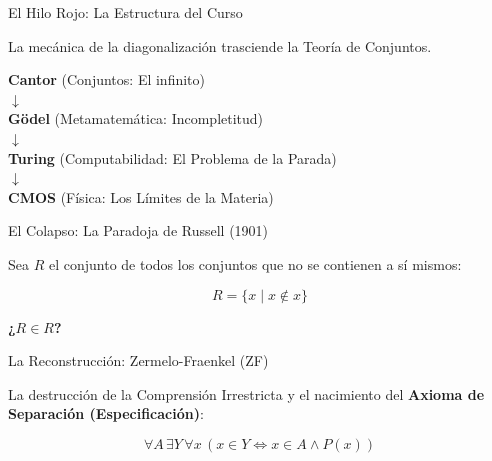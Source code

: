 \documentclass[10pt, aspectratio=169]{beamer}
\begin{document}
\begin{frame}{El Hilo Rojo: La Estructura del Curso}
    \begin{center}
        La mecánica de la diagonalización trasciende la Teoría de Conjuntos.
        
        \vspace{0.6cm}
        \large
        \textbf{Cantor} (Conjuntos: El infinito) \\
        $\downarrow$ \\
        \textbf{Gödel} (Metamatemática: Incompletitud) \\
        $\downarrow$ \\
        \textbf{Turing} (Computabilidad: El Problema de la Parada) \\
        $\downarrow$ \\
        \textbf{CMOS} (Física: Los Límites de la Materia)
    \end{center}
\end{frame}

\begin{frame}{El Colapso: La Paradoja de Russell (1901)}
    \begin{center}
        Sea $R$ el conjunto de todos los conjuntos que no se contienen a sí mismos:
        
        \Large
        \begin{equation*}
            R = \{x \mid x \notin x\}
        \end{equation*}
        
        \vspace{0.8cm}
        \alert{\textbf{¿$R \in R$?}}
    \end{center}
\end{frame}

\begin{frame}{La Reconstrucción: Zermelo-Fraenkel (ZF)}
    \begin{center}
        La destrucción de la Comprensión Irrestricta y el nacimiento del \textbf{Axioma de Separación (Especificación)}:
        
        \Large
        \vspace{0.5cm}
        \begin{equation*}
            \forall A \, \exists Y \, \forall x \, (x \in Y \iff x \in A \land P(x))
        \end{equation*}
        
        \normalsize
        \vspace{0.8cm}
    \end{center}
\end{frame}
\end{document}
